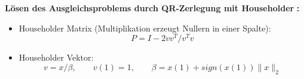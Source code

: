 \documentclass[a4paper]{article}
\begin{document}
{\bf Lösen des Ausgleichsproblems durch QR-Zerlegung mit Householder}\cite{Golub1989} {\bf :}
\begin{itemize}
\item Householder Matrix (Multiplikation erzeugt Nullern in einer Spalte):
  \begin{equation*}
    P = I - 2vv^T / v^Tv
  \end{equation*}
\item Householder Vektor:
  \begin{equation*}
    v = x / \beta,\qquad v(1) = 1, \qquad \beta = x(1) + sign(x(1)) \|x\|_2
  \end{equation*}
\end{itemize}



\end{document}

